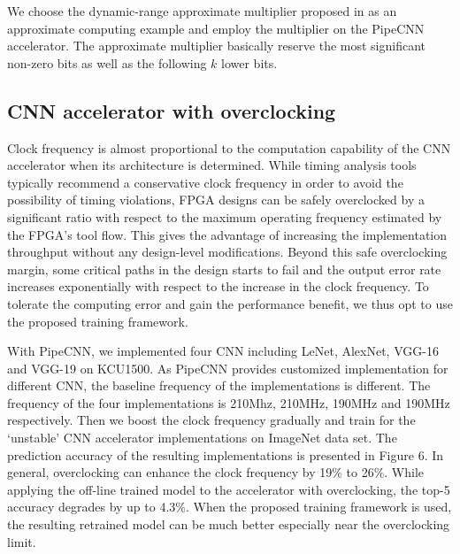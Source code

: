  
We choose the dynamic-range approximate multiplier proposed in \cite{} as 
an approximate computing example and employ the multiplier on the PipeCNN
accelerator. The approximate multiplier basically reserve the most 
significant non-zero bits as well as the following $k$ lower bits. 



\subsection{CNN accelerator with overclocking}
  Clock frequency is almost proportional to the computation capability of the CNN accelerator 
when its architecture is determined. While timing analysis tools typically recommend a 
conservative clock frequency in order to avoid the possibility of timing violations, 
FPGA designs can be safely overclocked by a significant ratio with respect to the maximum 
operating frequency estimated by the FPGA’s tool flow. This gives the advantage of increasing 
the implementation throughput without any design-level modifications. Beyond this safe overclocking 
margin, some critical paths in the design starts to fail and the output error rate increases 
exponentially with respect to the increase in the clock frequency. To tolerate the computing 
error and gain the performance benefit, we thus opt to use the proposed training framework.  

  With PipeCNN, we implemented four CNN including LeNet, AlexNet, VGG-16 and VGG-19 on KCU1500. 
As PipeCNN provides customized implementation for different CNN, the baseline frequency of the implementations 
is different. The frequency of the four implementations is 210Mhz, 210MHz, 190MHz and 190MHz respectively. 
Then we boost the clock frequency gradually and train for the ‘unstable’ CNN accelerator implementations on 
ImageNet data set.  The prediction accuracy of the resulting implementations is presented in Figure 6. In general, 
overclocking can enhance the clock frequency by 19\% to 26\%. While applying the off-line trained model 
to the accelerator with overclocking, the top-5 accuracy degrades by up to 4.3\%. When the proposed training 
framework is used, the resulting retrained model can be much better especially near the overclocking limit.

